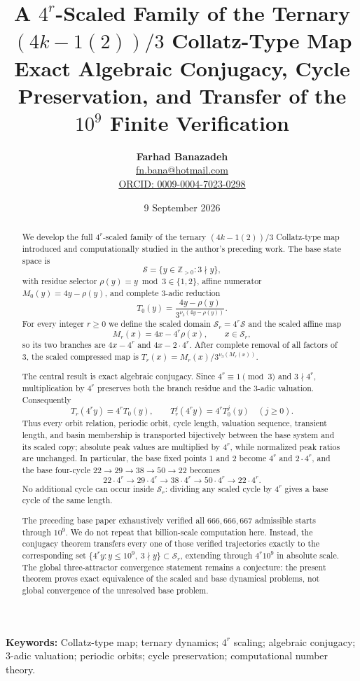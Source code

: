\documentclass[11pt]{article}
\title{\textbf{A $4^r$-Scaled Family of the Ternary $(4k-1(2))/3$ Collatz-Type Map}\\[4pt]
\large Exact Algebraic Conjugacy, Cycle Preservation, and Transfer of the $10^9$ Finite Verification}
\author{\textbf{Farhad Banazadeh}\\
\href{mailto:fn.bana@hotmail.com}{fn.bana@hotmail.com}\\
\href{https://orcid.org/0009-0004-7023-0298}{ORCID: 0009-0004-7023-0298}}
\date{9 September 2026}
\newcommand{\vthree}{\nu_3}
\newcommand{\Sbase}{\mathcal S}
\newcommand{\Sr}{\mathcal S_r}
\newcommand{\rhoo}{\rho}
\begin{document}
\maketitle

\begin{abstract}
We develop the full $4^r$-scaled family of the ternary $(4k-1(2))/3$ Collatz-type map introduced and computationally studied in the author's preceding work. The base state space is
\[
\Sbase=\{y\in\mathbb Z_{>0}:3\nmid y\},
\]
with residue selector $\rhoo(y)=y\bmod3\in\{1,2\}$, affine numerator $M_0(y)=4y-\rhoo(y)$, and complete 3-adic reduction
\[
T_0(y)=\frac{4y-\rhoo(y)}{3^{\vthree(4y-\rhoo(y))}}.
\]
For every integer $r\ge0$ we define the scaled domain $\Sr=4^r\Sbase$ and the scaled affine map
\[
M_r(x)=4x-4^r\rhoo(x),\qquad x\in\Sr,
\]
so its two branches are $4x-4^r$ and $4x-2\cdot4^r$. After complete removal of all factors of $3$, the scaled compressed map is $T_r(x)=M_r(x)/3^{\vthree(M_r(x))}$.

The central result is exact algebraic conjugacy. Since $4^r\equiv1\pmod3$ and $3\nmid4^r$, multiplication by $4^r$ preserves both the branch residue and the 3-adic valuation. Consequently
\[
T_r(4^r y)=4^rT_0(y),\qquad
T_r^j(4^r y)=4^rT_0^j(y)\quad(j\ge0).
\]
Thus every orbit relation, periodic orbit, cycle length, valuation sequence, transient length, and basin membership is transported bijectively between the base system and its scaled copy; absolute peak values are multiplied by $4^r$, while normalized peak ratios are unchanged. In particular, the base fixed points $1$ and $2$ become $4^r$ and $2\cdot4^r$, and the base four-cycle $22\to29\to38\to50\to22$ becomes
\[
22\cdot4^r\to29\cdot4^r\to38\cdot4^r\to50\cdot4^r\to22\cdot4^r.
\]
No additional cycle can occur inside $\Sr$: dividing any scaled cycle by $4^r$ gives a base cycle of the same length.

The preceding base paper exhaustively verified all $666,666,667$ admissible starts through $10^9$. We do not repeat that billion-scale computation here. Instead, the conjugacy theorem transfers every one of those verified trajectories exactly to the corresponding set $\{4^r y:y\le10^9,\ 3\nmid y\}\subset\Sr$, extending through $4^r10^9$ in absolute scale. The global three-attractor convergence statement remains a conjecture: the present theorem proves exact equivalence of the scaled and base dynamical problems, not global convergence of the unresolved base problem.
\end{abstract}

\noindent\textbf{Keywords:} Collatz-type map; ternary dynamics; $4^r$ scaling; algebraic conjugacy; 3-adic valuation; periodic orbits; cycle preservation; computational number theory.
\end{document}
